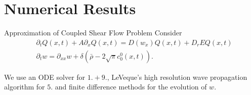 \section{Numerical Results}
\begin{frame}{Approximation of Coupled Shear Flow Problem}
	\scriptsize
	Consider
	\begin{equation}
		\begin{split}
			&\partial_t Q(x,t) + A\partial_x Q(x,t) =  D(w_x)Q(x,t)+ D_rEQ(x,t) \\
			&\partial_{t}w = \partial_{xx}w + \delta(\bar{\rho}-2\sqrt{\pi} c^0_0(x,t)).
		\end{split}
		\label{coupledsys_1d}
	\end{equation}
	\begin{table}[h]
		\centering
		\renewcommand{\arraystretch}{1.3}
		\caption{Splitting algorithm for solving the coupled shear flow problem (Dahm et al.)}
	\end{table}
	We use an ODE solver for $1.+9.$, LeVeque’s high resolution wave propagation algorithm for $5.$ and finite difference methods for the evolution of $w$.
\end{frame}


